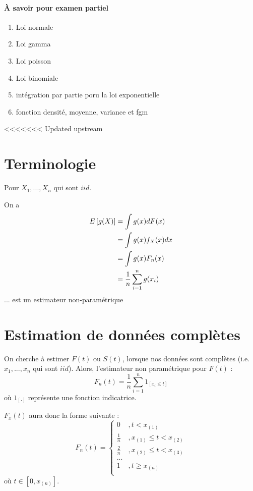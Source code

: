\documentclass[12pt, french]{report}
\begin{document}
\paragraph{À savoir pour examen partiel}

\begin{enumerate}[label=\faCheck]
\item Loi normale
\item Loi gamma
\item Loi poisson
\item Loi binomiale
\item intégration par partie poru la loi exponentielle
\item fonction densité, moyenne, variance et fgm
\end{enumerate}

<<<<<<< Updated upstream
\section{Terminologie}
Pour $X_1, ..., X_n $ qui sont $iid$.

On a
\begin{align*}
E \left[ g(X) \right] & = \int g(x) d F(x) \\
	& = \int g(x) f_X(x) dx \\
	& = \int g(x) F_n(x) \\
	& = \frac{1}{n} \sum_{i=1}^{n} g(x_i) \\
\end{align*}
... est un estimateur non-paramétrique

\section{Estimation de données complètes}
On cherche à estimer $F(t)$ ou $S(t)$, lorsque nos données sont complètes (i.e. $x_1, ..., x_n$ qui sont $iid$). Alors, l'estimateur non paramétrique pour $F(t)$ : 
\begin{equation}
F_n(t)	 = \frac{1}{n} \sum_{i=1}^{n} 1_{[x_i \leq t]}
\end{equation}
où $1_{[\cdot]}$ représente une fonction indicatrice.

$F_x(t)$ aura donc la forme suivante : 
\begin{equation}
F_n(t) =
\begin{cases}
0				& , t < x_{(1)} \\
\frac{1}{n}		& , x_{(1)} \leq t < x_{(2)} \\
\frac{2}{n}		& , x_{(2)} \leq t < x_{(3)} \\
...				& \\
1				& , t \geq x_{(n)} \\
\end{cases}
\end{equation}
où $t \in [0, x_{(n)}]$.
\end{document}
